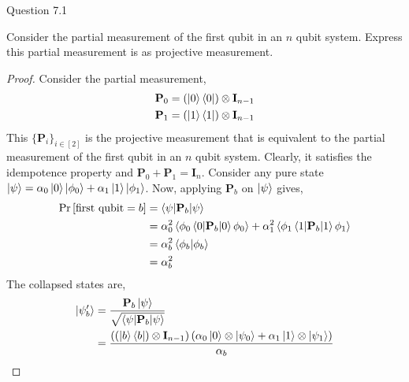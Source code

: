 \begin{solution}{Question 7.1}\label{ques:71}
    \begin{question}
        Consider the partial measurement of the first qubit in an $n$ qubit system. Express this partial measurement is as projective measurement.
    \end{question}
    \tcblower{}
    \begin{proof}
        Consider the partial measurement,
        \begin{equation}
            \begin{split}
                \mathbf{P}_0 = \left(\ket{0}\bra{0}\right)\otimes \mathbf{I}_{n-1}\\
                \mathbf{P}_1 = \left(\ket{1}\bra{1}\right)\otimes \mathbf{I}_{n-1}
            \end{split}
        \end{equation}
        This $\{\mathbf{P}_i\}_{i\in [2]}$ is the projective measurement that is equivalent to the partial measurement of the first qubit in an $n$ qubit system. Clearly, it satisfies the idempotence property and $\mathbf{P}_0 + \mathbf{P}_1 = \mathbf{I}_n$. Consider any pure state $\ket{\psi} = \alpha_0\ket{0}\ket{\phi_0} + \alpha_1\ket{1}\ket{\phi_1}$. Now, applying $\mathbf{P}_b$ on $\ket{\psi}$ gives,
        \begin{equation}
            \begin{split}
                \Pr\left[ \text{first qubit} = b \right] &= \braket{\psi | \mathbf{P}_b | \psi}\\
                                              &= \alpha_0^2\braket{\phi_0\braket{0 | \mathbf{P}_b | 0}\phi_0} + \alpha_1^2\braket{\phi_1\braket{1 | \mathbf{P}_b | 1}\phi_1}\\
                                              &= \alpha_b^2\braket{\phi_b | \phi_b}\\
                                              &= \alpha_b^2\\
            \end{split}
        \end{equation}
        The collapsed states are,
        \begin{equation}
            \begin{split}
                \ket{\psi'_b} &= \frac{\mathbf{P}_b\ket{\psi}}{\sqrt{\braket{\psi | \mathbf{P}_b | \psi}}}\\
                              &= \frac{\left(\left(\ket{b}\bra{b}\right)\otimes \mathbf{I}_{n-1}\right)\left(\alpha_0\ket{0}\otimes\ket{\psi_0} + \alpha_1\ket{1}\otimes\ket{\psi_1}\right)}{\alpha_b}\\

\end{split}
\end{equation}
\end{proof}
\end{solution}
